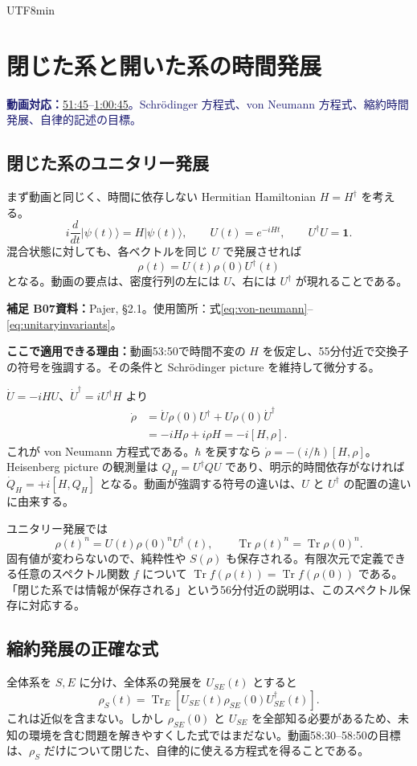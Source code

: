\documentclass[11pt,a4paper]{article}
\numberwithin{equation}{section}
\newcommand{\Tr}{\operatorname{Tr}}
\newcommand{\I}{\mathbf{1}}
\newcommand{\ket}[1]{\lvert#1\rangle}
\newcommand{\vid}[2]{\href{https://www.youtube.com/watch?v=3gDSaNy1O7Y\&t=#1s}{#2}}
\newcommand{\source}[1]{\par\noindent\textcolor{MidnightBlue}{\textbf{動画対応：}#1}\par}
\newcommand{\supp}[3]{\par\smallskip\noindent\textcolor{BrickRed}{\textbf{補足 #1}}\quad\textbf{資料：}#2\par\noindent\textbf{ここで適用できる理由：}#3\par}
\begin{document}
\begin{CJK*}{UTF8}{min}
\section{閉じた系と開いた系の時間発展}
\label{sec:dynamics}
\source{\vid{3105}{51:45}--\vid{3645}{1:00:45}。Schrödinger 方程式、von Neumann 方程式、縮約時間発展、自律的記述の目標。}
\subsection{閉じた系のユニタリー発展}
まず動画と同じく、時間に依存しない Hermitian Hamiltonian $H=H^\dagger$ を考える。
\begin{equation}
i\frac{d}{dt}\ket{\psi(t)}=H\ket{\psi(t)},
\qquad U(t)=e^{-iHt},\qquad U^\dagger U=\I.
\label{eq:schrodinger}
\end{equation}
混合状態に対しても、各ベクトルを同じ $U$ で発展させれば
\begin{equation}
\rho(t)=U(t)\rho(0)U^\dagger(t)
\label{eq:unitaryrho}
\end{equation}
となる。動画の要点は、密度行列の左には $U$、右には $U^\dagger$ が現れることである。

\supp{B07}{Pajer\cite{pajer}, §2.1。使用箇所：式\eqref{eq:von-neumann}--\eqref{eq:unitaryinvariants}。}{動画53:50で時間不変の $H$ を仮定し、55分付近で交換子の符号を強調する。その条件と Schrödinger picture を維持して微分する。}
$\dot U=-iHU$、$\dot U^\dagger=iU^\dagger H$ より
\begin{align}
\dot\rho
&=\dot U\rho(0)U^\dagger+U\rho(0)\dot U^\dagger\nonumber\\
&=-iH\rho+i\rho H=-i[H,\rho].
\label{eq:von-neumann}
\end{align}
これが von Neumann 方程式である。$\hbar$ を戻すなら $\dot\rho=-(i/\hbar)[H,\rho]$。Heisenberg picture の観測量は $Q_H=U^\dagger Q U$ であり、明示的時間依存がなければ $\dot Q_H=+i[H,Q_H]$ となる。動画が強調する符号の違いは、$U$ と $U^\dagger$ の配置の違いに由来する。

ユニタリー発展では
\begin{equation}
\rho(t)^n=U(t)\rho(0)^nU^\dagger(t),
\qquad \Tr\rho(t)^n=\Tr\rho(0)^n.
\label{eq:unitaryinvariants}
\end{equation}
固有値が変わらないので、純粋性や $S(\rho)$ も保存される。有限次元で定義できる任意のスペクトル関数 $f$ について $\Tr f(\rho(t))=\Tr f(\rho(0))$ である。「閉じた系では情報が保存される」という56分付近の説明は、このスペクトル保存に対応する。

\subsection{縮約発展の正確な式}
全体系を $S,E$ に分け、全体系の発展を $U_{SE}(t)$ とすると
\begin{equation}
\rho_S(t)=\Tr_E\!\left[U_{SE}(t)\rho_{SE}(0)U_{SE}^\dagger(t)\right].
\label{eq:exact-reduced}
\end{equation}
これは近似を含まない。しかし $\rho_{SE}(0)$ と $U_{SE}$ を全部知る必要があるため、未知の環境を含む問題を解きやすくした式ではまだない。動画58:30--58:50の目標は、$\rho_S$ だけについて閉じた、自律的に使える方程式を得ることである。


\end{CJK*}
\end{document}
